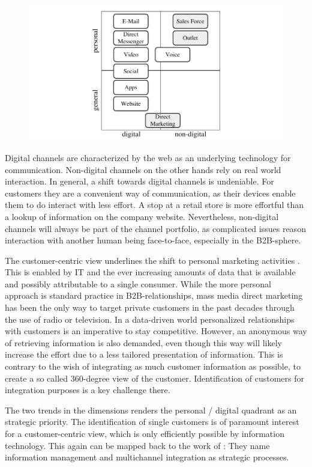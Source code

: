 			\begin{figure}[caption={Channel matrix}, label={fig:channelmatrix}]
			{	\includegraphics[width=.8\textwidth]{figures/channelmatrix.pdf}}
		\end{figure}
		
		Digital channels are characterized by the web as an underlying technology for communication. Non-digital channels on the other hands rely on real world interaction. In general, a shift towards digital channels is undeniable. For customers they are a convenient way of communication, as their devices enable them to do interact with less effort. A stop at a retail store is more effortful than a lookup of information on the company website. Nevertheless, non-digital channels will always be part of the channel portfolio, as complicated issues reason interaction with another human being face-to-face, especially in the B2B-sphere. 
		
		The customer-centric view underlines the shift to personal marketing activities \citep{peppers}. This is enabled by IT and the ever increasing amounts of data that is available and possibly attributable to a single consumer. While the more personal approach is standard practice in B2B-relationships, mass media direct marketing has been the only way to target private customers in the past decades through the use of radio or television. In a data-driven world personalized relationships with customers is an imperative to stay competitive. However, an anonymous way of retrieving information is also demanded, even though this way will likely increase the effort due to a less tailored presentation of information. This is contrary to the wish of integrating as much customer information as possible, to create a so called 360-degree view of the customer. Identification of customers for integration purposes is a key challenge there. 
		
		The two trends in the dimensions renders the personal / digital quadrant as an strategic priority.
		The identification of single customers is of paramount interest for a customer-centric view, which is only efficiently possible by information technology.  
		This again can be mapped back to the work of \citeauthor{paynefrow2005}: They name information management and multichannel integration as strategic processes. 
		
